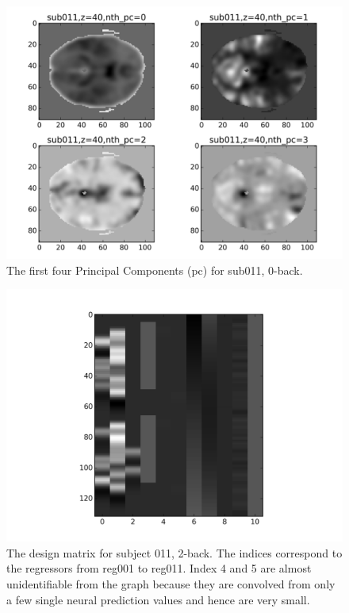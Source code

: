 \documentclass[11pt]{article}
\begin{document}
\begin{figure}[H]
\centering
\includegraphics[scale=0.4]{../results/sub011_task001_first_four_pcs.png}
\caption{The first four Principal Components (pc) for sub011, 0-back.}
\end{figure}

\begin{figure}[H]
\centering
\includegraphics[scale=0.4]{../results/sub011_task003_design_matrix.png}
\caption{The design matrix for subject 011, 2-back. The indices correspond to the regressors
from reg001 to reg011. Index 4 and 5 are almost unidentifiable from the graph because they
are convolved from only a few single neural prediction values and hence are very small.}
\end{figure}
\end{document}
